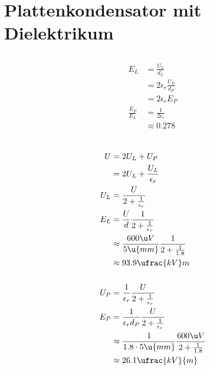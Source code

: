 \documentclass[11pt]{article}
\begin{document}
\section{Plattenkondensator mit Dielektrikum}
\subsection{}
\begin{align*}
    E_L &= \frac{U_L}{d_L}\\
    &= 2\epsilon_r \frac{U_P}{d_P}\\
    &= 2\epsilon_r E_P\\
    \frac{E_P}{E_L} &= \frac{1}{2\epsilon_r}\\
    &\approx 0.278\\
\end{align*}

\subsection{}
\begin{align*}
    U &= 2U_L + U_P\\
    &= 2U_L + \frac{U_L}{\epsilon_r}\\
    U_L &= \frac{U}{{2+ \frac1{\epsilon_r}}}\\
    E_L &=  \frac{U}{d}\frac{1}{{2+ \frac1{\epsilon_r}}}\\
    &\approx \frac{600 \u V}{5\u{mm}}\frac{1}{2+ \frac{1}{1.8}}\\
    &\approx 93.9 \ufrac {kV}m\\
    \\
    U_P &= \frac{1}{\epsilon_r}\frac{U}{{2+ \frac1{\epsilon_r}}}\\
    E_P &= \frac{1}{\epsilon_r d_P}\frac{U}{{2+ \frac1{\epsilon_r}}}\\
    &\approx \frac{1}{1.8\cdot 5\u {mm}}\frac{600 \u V}{2+ \frac{1}{1.8}}\\
    &\approx 26.1 \ufrac{kV}{m}
\end{align*}

\subsection{}
\begin{align*}
\end{align*}
\end{document}
